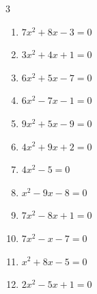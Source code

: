 \begin{multicols}{3}
\begin{enumerate}

  \item $7x^{2}+8x-3=0$


\columnbreak %

\resetques

  \item $3x^{2}+4x+1=0$


  \item $6x^{2}+5x-7=0$


  \item $6x^{2}-7x-1=0$


  \item $9x^{2}+5x-9=0$


  \item $4x^{2}+9x+2=0$


  \item $4x^{2}-5=0$


  \item $x^{2}-9x-8=0$


\columnbreak %

  \item $7x^{2}-8x+1=0$


  \item $7x^{2}-x-7=0$


  \item $x^{2}+8x-5=0$


  \item $2x^{2}-5x+1=0$


\end{enumerate}
\end{multicols}
